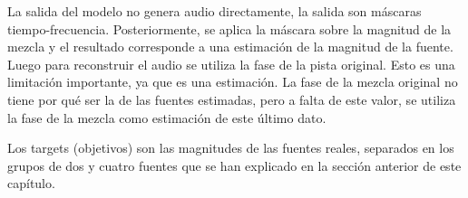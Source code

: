 La salida del modelo no genera audio directamente, la salida son máscaras tiempo-frecuencia. Posteriormente, se aplica la máscara sobre la magnitud de la mezcla y el resultado corresponde a una estimación de la magnitud de la fuente.
Luego para reconstruir el audio se utiliza la fase de la pista original. Esto es una limitación importante, ya que es una estimación. La fase de la mezcla original no tiene por qué ser la de las fuentes estimadas, pero a falta de este valor, se utiliza la fase de la mezcla como estimación de este último dato.

Los targets (objetivos) son las magnitudes de las fuentes reales, separados en los grupos de dos y cuatro fuentes que se han explicado en la sección anterior de este capítulo.





